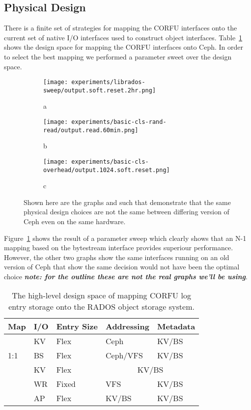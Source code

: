 \documentclass[10pt,twocolumn]{article}
\begin{document}
\subsection{Physical Design}

There is a finite set of strategies for mapping the CORFU interfaces onto the
current set of native I/O interfaces used to construct object interfaces.
Table~\ref{tab:pd-map} shows the design space for mapping the CORFU interfaces
onto Ceph. In order to select the best mapping we performed a parameter sweet
over the design space.

\begin{figure*}[!ht]
    \centering
    \begin{subfigure}{.6\columnwidth}
        \texttt{[image: experiments/librados-sweep/output.soft.reset.2hr.png]}
        \caption{a}
        \label{fig:vanilla-io-diff}
    \end{subfigure}\hfill
    \begin{subfigure}{.6\columnwidth}
        \texttt{[image: experiments/basic-cls-rand-read/output.read.60min.png]}
        \caption{b}
    \end{subfigure}\hfill
    \begin{subfigure}{.6\columnwidth}
        \texttt{[image: experiments/basic-cls-overhead/output.1024.soft.reset.png]}
        \caption{c}
    \end{subfigure}\hfill
    \caption{Shown here are the graphs and such that demonstrate that the same
        physical design choices are not the same between differing version of
    Ceph even on the same hardware.}
\end{figure*}

Figure~\ref{fig:vanilla-io-diff} shows the result of a parameter sweep which
clearly shows that an N-1 mapping based on the bytestream interface provides
superiour performance. However, the other two graphs show the same interfaces
running on an old version of Ceph that show the same decision would not have
been the optimal choice {\bf \emph{note: for the outline these are not the
real graphs we'll be using}}.

\begin{table}
\begin{tabular}{ | l | l | l | l | l |}
\hline
Map & I/O & Entry Size & Addressing & Metadata \\ \hline
\multirow{3}{*}{1:1} & KV  & Flex     & Ceph      & KV/BS \\ \cline{2-5}
                     & BS  & Flex     & Ceph/VFS  & KV/BS \\ \hline
\multirow{4}{*}{N:1} & KV  & Flex     & \multicolumn{2}{|c|}{KV/BS} \\ \cline{2-5}
                     & WR  & Fixed    & VFS       & KV/BS \\ \cline{2-5}
                     & AP  & Flex     & KV/BS     & KV/BS \\
\hline
\end{tabular}
\caption{The high-level design space of mapping CORFU log entry storage onto
the RADOS object storage system.}
\label{tab:pd-map}
\end{table}
\end{document}
